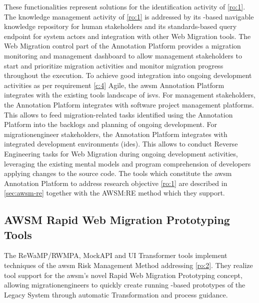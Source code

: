 These functionalities represent solutions for the identification activity of \cref{ro:1}.
The knowledge management activity of \cref{ro:1} is addressed by its -based navigable  knowledge repository for human stakeholders and its standards-based query endpoint for system actors and integration with other \gls{Web Migration} tools. 
The \gls{Web Migration} control part of the Annotation Platform provides a migration monitoring and management dashboard to allow management stakeholders to start and prioritize migration activities and monitor migration progress throughout the execution.
To achieve good integration into ongoing development activities as per requirement \cref{c:4} Agile, the \gls{awsm} Annotation Platform integrates with the existing tools landscape of \glspl{isv}.
For management stakeholders, the Annotation Platform integrates with software project management platforms.
This allows to feed migration-related tasks identified using the Annotation Platform into the backlogs and planning of ongoing development.
For \gls{migrationengineer} stakeholders, the Annotation Platform integrates with integrated development environments (\glspl{ide}).
This allows to conduct \gls{Reverse Engineering} tasks for \gls{Web Migration} during ongoing development activities, leveraging the existing mental models and program comprehension of developers applying changes to the  source code.
The tools which constitute the \gls{awsm} Annotation Platform to address research objective \cref{ro:1} are described in \cref{sec:awsm-re} together with the AWSM:RE method which they support.

\vspace{-10pt}
\hypertarget{sec:tools.rewamp}{%
\subsection{AWSM Rapid Web Migration Prototyping Tools}\label{sec:tools.rewamp}}
\vspace{10pt}

The ReWaMP/RWMPA, MockAPI and UI Transformer tools implement techniques of the \gls{awsm} Risk Management Method addressing \cref{ro:2}.
They realize tool support for the \gls{awsm}'s novel \gls{Rapid Web Migration Prototyping} concept, allowing \glspl{migrationengineer} to quickly create running -based prototypes of the \gls{Legacy System} through automatic \gls{Transformation} and process guidance.

